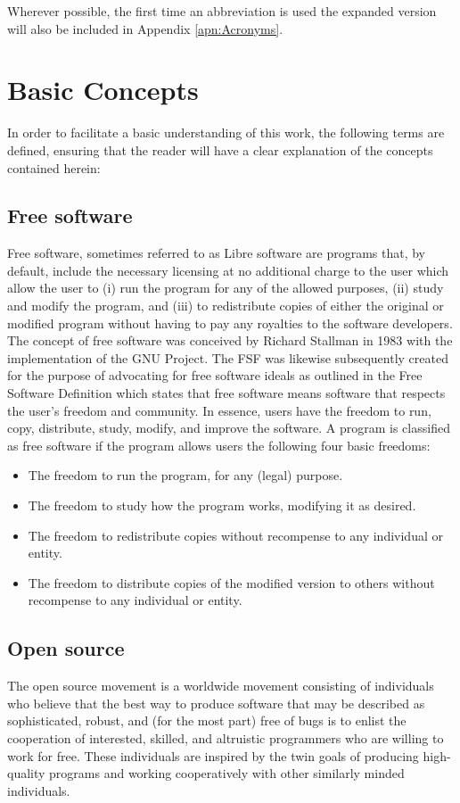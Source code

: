  Wherever possible, the first time an abbreviation is used the expanded version will also be included in Appendix \ref{apn:Acronyms}.
 
 \section{Basic Concepts }
In order to facilitate a basic understanding of this work, the following terms are defined, ensuring that the reader will have a clear explanation of the concepts contained herein:
 
 \subsection{Free software}
 \label{sec:freeopen}
Free software, sometimes referred to as Libre software are programs that, by default, include the necessary licensing at no additional charge to the user which allow the user to
 (i) run the program for any of the allowed purposes, (ii) study and modify the program, and (iii) to redistribute copies of either the original or modified program without having to pay any royalties to the software developers. The concept of free software was conceived by Richard Stallman in 1983 with the implementation of the \ac{GNU} Project. The \ac{FSF}  was likewise subsequently created for the purpose of advocating for free software ideals as outlined in the Free Software Definition which states that free software means software that respects the user’s freedom and community. In essence, users have the freedom to run, copy, distribute, study, modify, and improve the software. A program is classified as free software if the program allows users the following four basic freedoms:

 \begin{itemize}
 \item The freedom to run the program, for any (legal) purpose.
 
 \item The freedom to study how the program works, modifying it as desired.
 
 \item The freedom to redistribute copies without recompense to any individual or entity.
 
 \item The freedom to distribute copies of the modified version to others without recompense to any individual or entity.
 \end{itemize}
  \subsection{Open source}
 The open source movement is a worldwide movement consisting of individuals who believe that the best way to produce software that may be described as sophisticated, robust, and (for the most part) free of bugs is to enlist the cooperation of interested, skilled, and altruistic programmers who are willing to work for free. These individuals are inspired by the twin goals of producing high-quality programs and working cooperatively with other similarly minded individuals.
 

